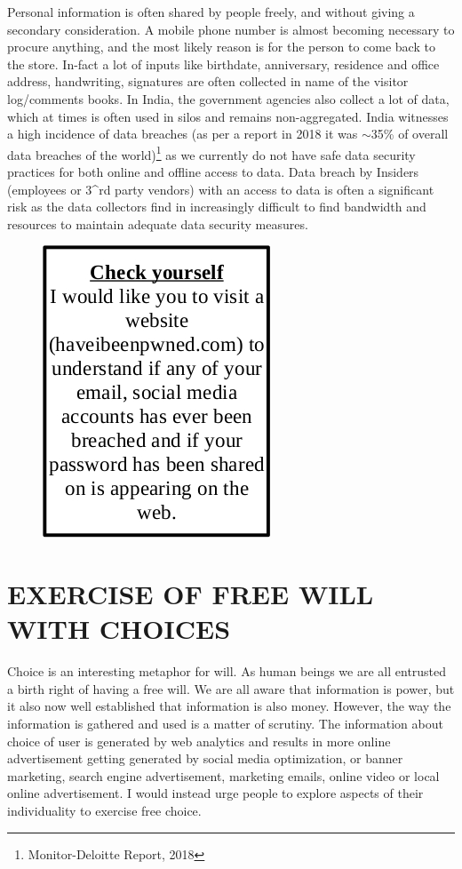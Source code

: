 \begin{multicols}{2}
Personal information is often shared by people freely, and without giving a secondary consideration. A mobile phone number is almost becoming necessary to procure anything, and the most likely reason is for the person to come back to the store. In-fact a lot of inputs like birthdate, anniversary, residence and office address, handwriting, signatures are often collected in name of the visitor log/comments books. In India, the government agencies also collect a lot of data, which at times is often used in silos and remains non-aggregated. India witnesses a high incidence of data breaches (as per a report in 2018 it was $\sim$35\% of overall data breaches of the world)\footnote{Monitor-Deloitte Report, 2018} as we currently do not have safe data security practices for both online and offline access to data. Data breach by Insiders (employees or 3^{\rm rd} party vendors) with an access to data is often a significant risk as the data collectors find in increasingly difficult to find bandwidth and resources to maintain adequate data security measures.
\begin{figure}[H]
\centering
\includegraphics[scale=1.2]{src/Figures/chap2/fig01.jpg}
\caption{}\label{fig01}
\end{figure}

\section{EXERCISE OF FREE WILL WITH CHOICES}

Choice is an interesting metaphor for will. As human beings we are all entrusted a birth right of having a free will. We are all aware that information is power, but it also now well established that information is also money.  However, the way the information is gathered and used is a matter of scrutiny. The information about choice of user is generated by web analytics and results in more online advertisement getting generated by social media optimization, or banner marketing, search engine advertisement, marketing emails, online video or local online advertisement. I would instead urge people to explore aspects of their individuality to exercise free choice.


\end{multicols}
